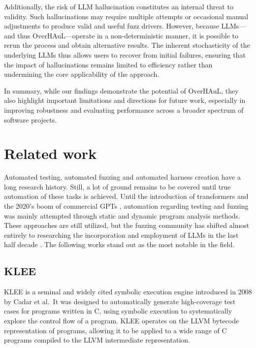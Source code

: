 \documentclass[
  a4paper,
]{scrreprt}
\theoremstyle{definition}
\theoremstyle{remark}
\begin{document}
Additionally, the risk of LLM hallucination constitutes an internal
threat to validity. Such hallucinations may require multiple attempts or
occasional manual adjustments to produce valid and useful fuzz drivers.
However, because LLMs---and thus OverHAuL---operate in a
non-deterministic manner, it is possible to rerun the process and obtain
alternative results. The inherent stochasticity of the underlying LLMs
thus allows users to recover from initial failures, ensuring that the
impact of hallucinations remains limited to efficiency rather than
undermining the core applicability of the approach.

In summary, while our findings demonstrate the potential of OverHAuL,
they also highlight important limitations and directions for future
work, especially in improving robustness and evaluating performance
across a broader spectrum of software projects.


\chapter{Related work}\label{sec-related}

Automated testing, automated fuzzing and automated harness creation have
a long research history. Still, a lot of ground remains to be covered
until true automation of these tasks is achieved. Until the introduction
of transformers \autocite{vaswani2023} and the 2020's boom of commercial
GPTs \autocite{chatgpt}, automation regarding testing and fuzzing was
mainly attempted through static and dynamic program analysis methods.
These approaches are still utilized, but the fuzzing community has
shifted almost entirely to researching the incorporation and employment
of LLMs in the last half decade
\autocite{iris,sun2024,prophetfuzz,oss-fuzz-gen,green2022,utopia,fuzzgpt,titanfuzz,fuzzgen,fudge}.
The following works stand out as the most notable in the field.

\section{KLEE}\label{klee}

KLEE \autocite{klee} is a seminal and widely cited symbolic execution
engine introduced in 2008 by Cadar et al.~It was designed to
automatically generate high-coverage test cases for programs written in
C, using symbolic execution to systematically explore the control flow
of a program. KLEE operates on the LLVM \autocite{llvm} bytecode
representation of programs, allowing it to be applied to a wide range of
C programs compiled to the LLVM intermediate representation.
\end{document}
